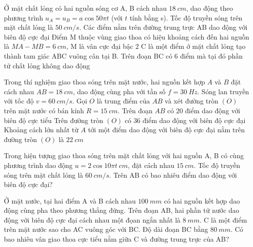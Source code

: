 \begin{ex}
Ở mặt chất lỏng có hai nguồn sóng cơ A, B cách nhau $18\ cm$, dao động theo phương trình $u_A = u_B = a \cos 50\pi t$ (với $t$ tính bằng s). Tốc độ truyền sóng trên mặt chất lỏng là $50\ cm/s$.
{\True Các điểm nằm trên đường trung trực AB dao động với biên độ cực đại}
{Điểm M thuộc vùng giao thoa có hiệu khoảng cách đến hai nguồn là $MA - MB = 6\ cm$, M là vân cực đại bậc 2}
{C là một điểm ở mặt chất lỏng tạo thành tam giác ABC vuông cân tại B. Trên đoạn BC có 6 điểm mà tại đó phần tử chất lỏng không dao động}
\end{ex}
\begin{ex}
Trong thí nghiệm giao thoa sóng trên mặt nước, hai nguồn kết hợp $A$ và $B$ đặt cách nhau $AB = 18\ cm$, dao động cùng pha với tần số $f = 30\ Hz$. Sóng lan truyền với tốc độ $v = 60\ cm/s$. Gọi $O$ là trung điểm của $AB$ và xét đường tròn $(O)$ trên mặt nước có bán kính $R = 15\ cm$.
{Trên đoạn $AB$ có $20$ điểm dao động với biên độ cực tiểu}
{Trên đường tròn $(O)$ có $36$ điểm dao động với biên độ cực đại}
{Khoảng cách lớn nhất từ $A$ tới một điểm dao động với biên độ cực đại nằm trên đường tròn $(O)$ là $22\ cm$}
\loigiai{
\begin{itemchoice}
\itemch
\itemch
\itemch
\itemch
\end{itemchoice}
}
\end{ex}
\PhanIII
\setcounter{ex}{0}
\begin{ex}
Trong hiện tượng giao thoa sóng trên mặt chất lỏng với hai nguồn A, B có cùng phương trình dao động $u=2 \cos 10 \pi t~ cm$, đặt cách nhau $15 ~cm$. Tốc độ truyền sóng trên mặt chất lỏng là $60 ~cm/s$. Trên AB có bao nhiêu điểm dao động với biên độ cực đại?\\
\end{ex} 
\begin{ex}
Ở mặt nước, tại hai điểm A và B cách nhau $100 ~mm$ có hai nguồn kết hợp dao động cùng pha theo phương thẳng đứng. Trên đoạn AB, hai phần tử nước dao động với biên độ cực đại cách nhau một đọan ngắn nhất là $8 ~mm$. C là một điểm trên mặt nước sao cho AC vuông góc với BC. Độ dài đoạn BC bằng $80 ~mm$. Có bao nhiêu vân giao thoa cực tiểu nằm giữa C và đường trung trực của AB?\\
\end{ex} 
